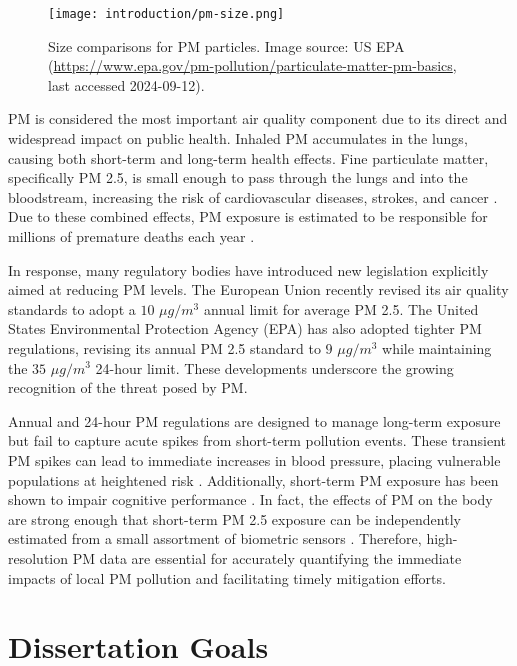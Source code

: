 \begin{figure}[!h]
  \centering
  \texttt{[image: introduction/pm-size.png]}
  \caption{Size comparisons for PM particles. Image source: US EPA
    (\url{https://www.epa.gov/pm-pollution/particulate-matter-pm-basics}, last
    accessed 2024-09-12).}
  \label{fig:pm-size-scale}
\end{figure}

PM is considered the most important air quality component due to its direct and
widespread impact on public health. Inhaled PM accumulates in the lungs, causing
both short-term and long-term health effects. Fine particulate matter,
specifically PM 2.5, is small enough to pass through the lungs and into the
bloodstream, increasing the risk of cardiovascular diseases, strokes, and cancer
\cite{pm-disease-1, pm-disease-2, pm-cancer}. Due to these combined effects, PM
exposure is estimated to be responsible for millions of premature deaths each
year \cite{pm-mortality-1, pm-mortality-fine}.

In response, many regulatory bodies have introduced new legislation explicitly aimed
at reducing PM levels. The European Union recently revised its air quality
standards to adopt a $10$ $\mu g/m^3$ annual limit for average PM 2.5.
The United States Environmental Protection Agency (EPA) has also adopted tighter
PM regulations, revising its annual PM 2.5 standard to $9$ $\mu g/m^3$ while
maintaining the $35$ $\mu g/m^3$ 24-hour limit.
These developments underscore the growing recognition of the threat posed by PM.


Annual and 24-hour PM regulations are designed to manage long-term exposure but
fail to capture acute spikes from short-term pollution events. These
transient PM spikes can lead to immediate increases in blood pressure, placing
vulnerable populations at heightened risk \cite{pm-bp}. Additionally, short-term
PM exposure has been shown to impair cognitive performance \cite{pm-cognition}.
In fact, the effects of PM on the body are strong enough that short-term PM 2.5
exposure can be independently estimated from a small assortment of biometric
sensors \cite{shawhin-biometrics, shisir-biometrics}. Therefore, high-resolution
PM data are essential for accurately quantifying the immediate impacts of local
PM pollution and facilitating timely mitigation efforts.

\section{Dissertation Goals}

